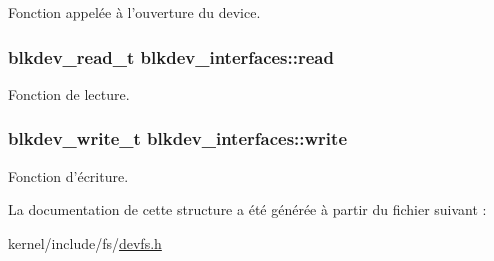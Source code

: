 Fonction appelée à l'ouverture du device. \hypertarget{structblkdev__interfaces_ad14a2ad714105cdb8ce002eb4fb9e747}{
\subsubsection[{read}]{\setlength{\rightskip}{0pt plus 5cm}blkdev\+\_\+read\+\_\+t blkdev\+\_\+interfaces\+::read}}\label{structblkdev__interfaces_ad14a2ad714105cdb8ce002eb4fb9e747}
Fonction de lecture. \hypertarget{structblkdev__interfaces_ae99fb7e1529ef6c24df9dc454bc0f9f6}{
\subsubsection[{write}]{\setlength{\rightskip}{0pt plus 5cm}blkdev\+\_\+write\+\_\+t blkdev\+\_\+interfaces\+::write}}\label{structblkdev__interfaces_ae99fb7e1529ef6c24df9dc454bc0f9f6}
Fonction d'écriture. 

La documentation de cette structure a été générée à partir du fichier suivant \+:\begin{DoxyCompactItemize}
\item 
kernel/include/fs/\hyperlink{devfs_8h}{devfs.\+h}\end{DoxyCompactItemize}

